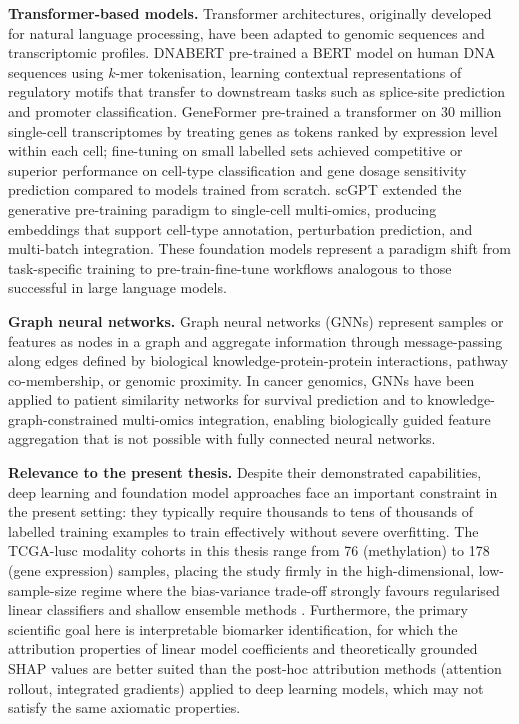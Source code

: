 \textbf{Transformer-based models.}
Transformer architectures, originally developed for natural language processing, have been adapted to genomic sequences and transcriptomic profiles. DNABERT \parencite{Ji2021} pre-trained a BERT model on human DNA sequences using $k$-mer tokenisation, learning contextual representations of regulatory motifs that transfer to downstream tasks such as splice-site prediction and promoter classification. GeneFormer \parencite{Theodoris2023} pre-trained a transformer on 30 million single-cell transcriptomes by treating genes as tokens ranked by expression level within each cell; fine-tuning on small labelled sets achieved competitive or superior performance on cell-type classification and gene dosage sensitivity prediction compared to models trained from scratch. scGPT \parencite{Cui2024} extended the generative pre-training paradigm to single-cell multi-omics, producing embeddings that support cell-type annotation, perturbation prediction, and multi-batch integration. These foundation models represent a paradigm shift from task-specific training to pre-train-fine-tune workflows analogous to those successful in large language models.
 
\textbf{Graph neural networks.}
Graph neural networks (GNNs) represent samples or features as nodes in a graph and aggregate information through message-passing along edges defined by biological knowledge-protein-protein interactions, pathway co-membership, or genomic proximity. In cancer genomics, GNNs have been applied to patient similarity networks for survival prediction and to knowledge-graph-constrained multi-omics integration, enabling biologically guided feature aggregation that is not possible with fully connected neural networks.
 
\textbf{Relevance to the present thesis.}
Despite their demonstrated capabilities, deep learning and foundation model approaches face an important constraint in the present setting: they typically require thousands to tens of thousands of labelled training examples to train effectively without severe overfitting. The TCGA-\gls{lusc} modality cohorts in this thesis range from 76 (methylation) to 178 (gene expression) samples, placing the study firmly in the high-dimensional, low-sample-size regime where the bias-variance trade-off strongly favours regularised linear classifiers and shallow ensemble methods \parencite{Vabalas2019}. Furthermore, the primary scientific goal here is interpretable biomarker identification, for which the attribution properties of linear model coefficients and theoretically grounded SHAP values \parencite{Lundberg2017, Lundberg2020} are better suited than the post-hoc attribution methods (attention rollout, integrated gradients) applied to deep learning models, which may not satisfy the same axiomatic properties.


